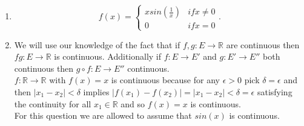 \documentclass{amsart}
\begin{document}
    \begin{enumerate}
        \item 
            \[
                f(x) =
            \begin{cases}
                x sin(\frac{1}{x}) & if x \ne 0\\
                0 & if x = 0
            \end{cases}
            .\] 
        \item 
            We will use our knowledge of the fact that if $f,g : E \rightarrow \mathbb{R} $ are continuous then $fg : E \rightarrow \mathbb{R} $ is continuous.
            Additionally if $f: E \rightarrow E'$ and $g: E' \rightarrow E''$ both continuous then $g \circ f : E \rightarrow E''$ continuous.\\
            $f: \mathbb{R} \rightarrow \mathbb{R} $ with $f(x) = x$ is continuous because for any $\epsilon > 0$ pick $\delta = \epsilon $ and then
            $|x_1-x_2| < \delta $ implies $|f(x_1) - f(x_2)| = |x_1-x_2| < \delta = \epsilon $ satisfying the continuity for all $x_1 \in \mathbb{R} $ and so $f(x) = x$ is continuous.
            \\
            For this question we are allowed to assume that $sin(x)$ is continuous.\\


\end{enumerate}
\end{document}
